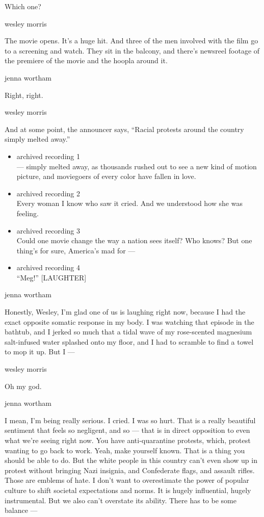Which one?

wesley morris

The movie opens. It's a huge hit. And three of the men involved with the
film go to a screening and watch. They sit in the balcony, and there's
newsreel footage of the premiere of the movie and the hoopla around it.

jenna wortham

Right, right.

wesley morris

And at some point, the announcer says, ``Racial protests around the
country simply melted away.''

\begin{itemize}
\item
  archived recording 1\\
  --- simply melted away, as thousands rushed out to see a new kind of
  motion picture, and moviegoers of every color have fallen in love.
\item
  archived recording 2\\
  Every woman I know who saw it cried. And we understood how she was
  feeling.
\item
  archived recording 3\\
  Could one movie change the way a nation sees itself? Who knows? But
  one thing's for sure, America's mad for ---
\item
  archived recording 4\\
  ``Meg!'' {[}LAUGHTER{]}
\end{itemize}

jenna wortham

Honestly, Wesley, I'm glad one of us is laughing right now, because I
had the exact opposite somatic response in my body. I was watching that
episode in the bathtub, and I jerked so much that a tidal wave of my
rose-scented magnesium salt-infused water splashed onto my floor, and I
had to scramble to find a towel to mop it up. But I ---

wesley morris

Oh my god.

jenna wortham

I mean, I'm being really serious. I cried. I was so hurt. That is a
really beautiful sentiment that feels so negligent, and so --- that is
in direct opposition to even what we're seeing right now. You have
anti-quarantine protests, which, protest wanting to go back to work.
Yeah, make yourself known. That is a thing you should be able to do. But
the white people in this country can't even show up in protest without
bringing Nazi insignia, and Confederate flags, and assault rifles. Those
are emblems of hate. I don't want to overestimate the power of popular
culture to shift societal expectations and norms. It is hugely
influential, hugely instrumental. But we also can't overstate its
ability. There has to be some balance ---

